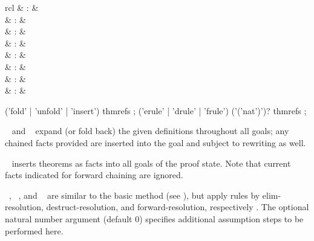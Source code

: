 \begin{isabellebody}
\begin{isamarkuptext}
\begin{descr}
  \end{descr}%
\end{isamarkuptext}%
\isamarkuptrue%
%
\isamarkuptrue%
%
\isamarkuptrue%
%
\begin{isamarkuptext}%
\begin{matharray}{rcl}
    \mbox{} & : & \isarmeth \\
    \mbox{} & : & \isarmeth \\
    \mbox{} & : & \isarmeth \\[0.5ex]
    \mbox{}\isa{\isactrlsup {\isacharasterisk}} & : & \isarmeth \\
    \mbox{}\isa{\isactrlsup {\isacharasterisk}} & : & \isarmeth \\
    \mbox{}\isa{\isactrlsup {\isacharasterisk}} & : & \isarmeth \\
    \mbox{} & : & \isarmeth \\
    \mbox{} & : & \isarmeth \\
  \end{matharray}

  \begin{rail}
    ('fold' | 'unfold' | 'insert') thmrefs
    ;
    ('erule' | 'drule' | 'frule') ('('nat')')? thmrefs
    ;
  \end{rail}

  \begin{descr}
  
  \item [\mbox{\isa{unfold}}~\isa{a\isactrlsub {\isadigit{1}}\ {\isasymdots}\ a\isactrlsub n} and \mbox{\isa{fold}}~\isa{a\isactrlsub {\isadigit{1}}\ {\isasymdots}\ a\isactrlsub n}] expand (or fold back) the
  given definitions throughout all goals; any chained facts provided
  are inserted into the goal and subject to rewriting as well.

  \item [\mbox{\isa{insert}}~\isa{a\isactrlsub {\isadigit{1}}\ {\isasymdots}\ a\isactrlsub n}] inserts
  theorems as facts into all goals of the proof state.  Note that
  current facts indicated for forward chaining are ignored.

  \item [\mbox{\isa{erule}}~\isa{a\isactrlsub {\isadigit{1}}\ {\isasymdots}\ a\isactrlsub n}, \mbox{\isa{drule}}~\isa{a\isactrlsub {\isadigit{1}}\ {\isasymdots}\ a\isactrlsub n}, and \mbox{\isa{frule}}~\isa{a\isactrlsub {\isadigit{1}}\ {\isasymdots}\ a\isactrlsub n}] are similar to the basic \mbox{}
  method (see ), but apply rules by
  elim-resolution, destruct-resolution, and forward-resolution,
  respectively \cite{isabelle-ref}.  The optional natural number
  argument (default 0) specifies additional assumption steps to be
  performed here.


\end{descr}
\end{isamarkuptext}
\end{isabellebody}
